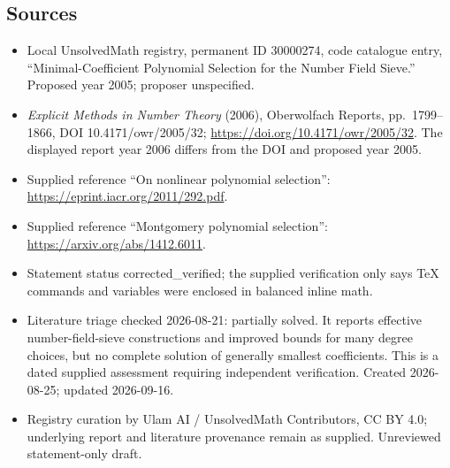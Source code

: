 \documentclass[11pt]{article}
\begin{document}
\subsection{Sources}
\begin{itemize}
\item Local UnsolvedMath registry, permanent ID 30000274, code catalogue entry, ``Minimal-Coefficient Polynomial Selection for the Number Field Sieve.'' Proposed year 2005; proposer unspecified.
\item \emph{Explicit Methods in Number Theory} (2006), Oberwolfach Reports, pp.\ 1799--1866, DOI 10.4171/owr/2005/32; \url{https://doi.org/10.4171/owr/2005/32}. The displayed report year 2006 differs from the DOI and proposed year 2005.
\item Supplied reference ``On nonlinear polynomial selection'': \url{https://eprint.iacr.org/2011/292.pdf}.
\item Supplied reference ``Montgomery polynomial selection'': \url{https://arxiv.org/abs/1412.6011}.
\item Statement status corrected\_verified; the supplied verification only says TeX commands and variables were enclosed in balanced inline math.
\item Literature triage checked 2026-08-21: partially solved. It reports effective number-field-sieve constructions and improved bounds for many degree choices, but no complete solution of generally smallest coefficients. This is a dated supplied assessment requiring independent verification. Created 2026-08-25; updated 2026-09-16.
\item Registry curation by Ulam AI / UnsolvedMath Contributors, CC BY 4.0; underlying report and literature provenance remain as supplied. Unreviewed statement-only draft.
\end{itemize}
\end{document}
